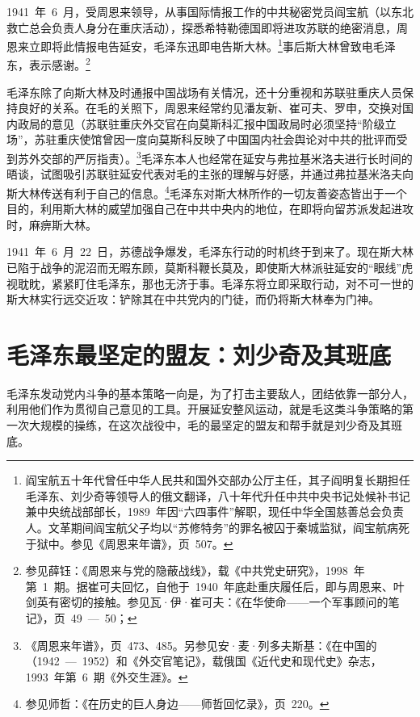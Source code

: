 1941~年~6~月，受周恩来领导，从事国际情报工作的中共秘密党员阎宝航（以东北救亡总会负责人身分在重庆活动），探悉希特勒德国即将进攻苏联的绝密消息，周恩来立即将此情报电告延安，毛泽东迅即电告斯大林。\footnote{阎宝航五十年代曾任中华人民共和国外交部办公厅主任，其子阎明复长期担任毛泽东、刘少奇等领导人的俄文翻译，八十年代升任中共中央书记处候补书记兼中央统战部部长，1989~年因“六四事件”解职，现任中华全国慈善总会负责人。文革期间阎宝航父子均以“苏修特务”的罪名被囚于秦城监狱，阎宝航病死于狱中。参见《周恩来年谱》，页~507。}事后斯大林曾致电毛泽东，表示感谢。\footnote{参见薛钰：《周恩来与党的隐蔽战线》，载《中共党史研究》，1998~年第~1~期。据崔可夫回忆，自他于~1940~年底赴重庆履任后，即与周恩来、叶剑英有密切的接触。参见瓦·伊·崔可夫：《在华使命——一个军事顾问的笔记》，页~49~—~50；}

毛泽东除了向斯大林及时通报中国战场有关情况，还十分重视和苏联驻重庆人员保持良好的关系。在毛的关照下，周恩来经常约见潘友新、崔可夫、罗申，交换对国内政局的意见（苏联驻重庆外交官在向莫斯科汇报中国政局时必须坚持“阶级立场”，苏驻重庆使馆曾因一度向莫斯科反映了中国国内社会舆论对中共的批评而受到苏外交部的严厉指责）。\footnote{《周恩来年谱》，页~473、485。另参见安·麦·列多夫斯基：《在中国的（1942~—~1952）和《外交官笔记》，载俄国《近代史和现代史》杂志，1993~年第~6~期《外交生涯》。}毛泽东本人也经常在延安与弗拉基米洛夫进行长时间的晤谈，试图吸引苏联驻延安代表对毛的主张的理解与好感，并通过弗拉基米洛夫向斯大林传送有利于自己的信息。\footnote{参见师哲：《在历史的巨人身边——师哲回忆录》，页~220。}毛泽东对斯大林所作的一切友善姿态皆出于一个目的，利用斯大林的威望加强自己在中共中央内的地位，在即将向留苏派发起进攻时，麻痹斯大林。

1941~年~6~月~22~日，苏德战争爆发，毛泽东行动的时机终于到来了。现在斯大林已陷于战争的泥沼而无暇东顾，莫斯科鞭长莫及，即使斯大林派驻延安的“眼线”虎视耽眈，紧紧盯住毛泽东，那也无济于事。毛泽东将立即采取行动，对不可一世的斯大林实行远交近攻：铲除其在中共党内的门徒，而仍将斯大林奉为门神。

\section{毛泽东最坚定的盟友：刘少奇及其班底}

毛泽东发动党内斗争的基本策略一向是，为了打击主要敌人，团结依靠一部分人，利用他们作为贯彻自己意见的工具。开展延安整风运动，就是毛这类斗争策略的第一次大规模的操练，在这次战役中，毛的最坚定的盟友和帮手就是刘少奇及其班底。

